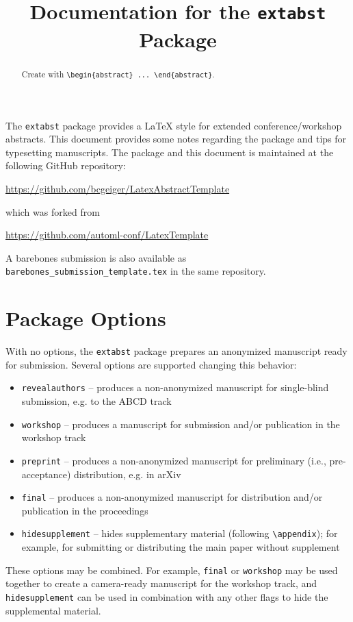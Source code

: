 \documentclass[11pt]{article}
\title{Documentation for the \texttt{extabst} Package}
\author[1,$\ast$]{\nameemail{Author 1}{email1@example.com}}
\author[1,2,$\ast$]{\nameemail{Author 2}{email2@example.com}}
\author[2]{\nameemail{Author 3}{email3@example.com}}
\affil[$\ast$]{Equal contribution.}
\affil[1]{Institution 1}
\affil[2]{Institution 2}
\begin{document}
\maketitle

\begin{abstract}
  Create with \verb|\begin{abstract} ... \end{abstract}|.
\end{abstract}

The \texttt{extabst} package provides a \LaTeX{} style for extended conference/workshop abstracts.
This document provides some notes regarding the package and tips for typesetting
manuscripts. The package and this document is maintained at the following GitHub
repository:
\begin{center}
  \url{https://github.com/bcgeiger/LatexAbstractTemplate}
\end{center}
which was forked from 
\begin{center}
  \url{https://github.com/automl-conf/LatexTemplate}
\end{center}

A barebones submission is also available as
\texttt{barebones\_submission\_template.tex} in the same repository.

\section{Package Options}

With no options, the \texttt{extabst} package prepares an anonymized manuscript
ready for submission. Several options are supported changing
this behavior:
\begin{itemize}
\item \texttt{revealauthors} -- produces a non-anonymized manuscript for
  single-blind submission, e.g. to the ABCD track
\item \texttt{workshop} -- produces a manuscript for submission and/or
  publication in the workshop track
\item \texttt{preprint} -- produces a non-anonymized manuscript for
  preliminary (i.e., pre-acceptance) distribution, e.g. in arXiv
\item \texttt{final} -- produces a non-anonymized manuscript for distribution
  and/or publication in the proceedings
\item \texttt{hidesupplement} -- hides supplementary material (following
  \verb|\appendix|); for example, for submitting or distributing the main paper
  without supplement
\end{itemize}
These options may be combined. For example, \texttt{final} or \texttt{workshop}
may be used together to create a camera-ready manuscript for the workshop track,
and \texttt{hidesupplement} can be used in combination with any other flags to
hide the supplemental material.
\end{document}

